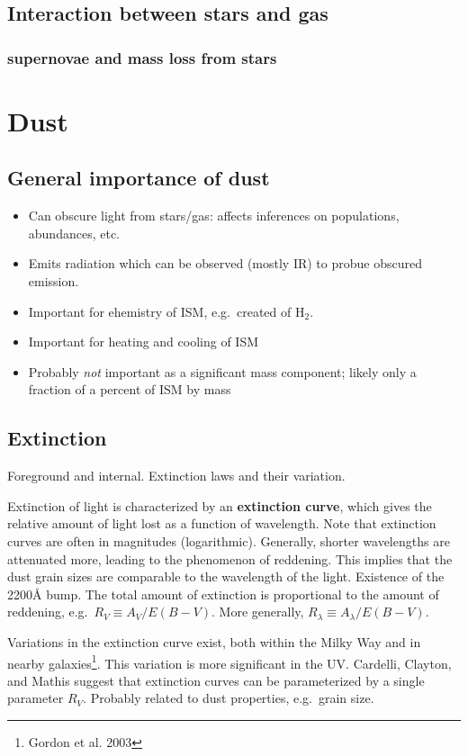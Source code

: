 \documentclass{article}
\begin{document}
\subsection{Interaction between stars and gas}
\subsubsection{supernovae and mass loss from stars}


\newpage
\section{Dust}
\subsection{General importance of dust}
\begin{itemize}
    \item Can obscure light from stars/gas: affects inferences on
        populations, abundances, etc.
    \item Emits radiation which can be observed (mostly IR) to probue
        obscured emission.
    \item Important for ehemistry of ISM, e.g.\ created of H$_{2}$.
    \item Important for heating and cooling of ISM
    \item Probably \emph{not} important as a significant mass component;
        likely only a fraction of a percent of ISM by mass
\end{itemize}

\subsection{Extinction}
Foreground and internal. Extinction laws and their variation.

Extinction of light is characterized by an \textbf{extinction curve}, which gives
the relative amount of light lost as a function of wavelength. Note that
extinction curves are often in magnitudes (logarithmic). Generally,
shorter wavelengths are attenuated more, leading to the phenomenon of
reddening. This implies that the dust grain sizes are comparable to the
wavelength of the light. \textcolor{bred}{Existence of the 2200\AA{} bump.}
The total amount of extinction is proportional to the amount of reddening,
e.g.\ $R_{V} \equiv A_{V}/E(B-V)$.
More generally, $R_{\lambda} \equiv A_{\lambda}/E(B-V)$.

Variations in the extinction curve exist, both within the Milky Way
and in nearby galaxies\footnote{Gordon et al. 2003}. This variation is
more significant in the UV. Cardelli, Clayton, and Mathis suggest that
extinction curves can be parameterized by a single parameter $R_{V}$.
Probably related to dust properties, e.g.\ grain size.
\end{document}
